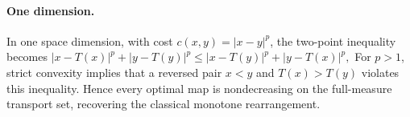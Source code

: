 \paragraph{One dimension.}
In one space dimension, with cost $c(x,y)=|x-y|^p$, the two-point inequality becomes
\(|x-T(x)|^p+|y-T(y)|^p \leq |x-T(y)|^p+|y-T(x)|^p,\)
For $p>1$, strict convexity implies that a reversed pair $x<y$ and $T(x)>T(y)$ violates this inequality. Hence every optimal map is nondecreasing on the full-measure transport set, recovering the classical monotone rearrangement.
